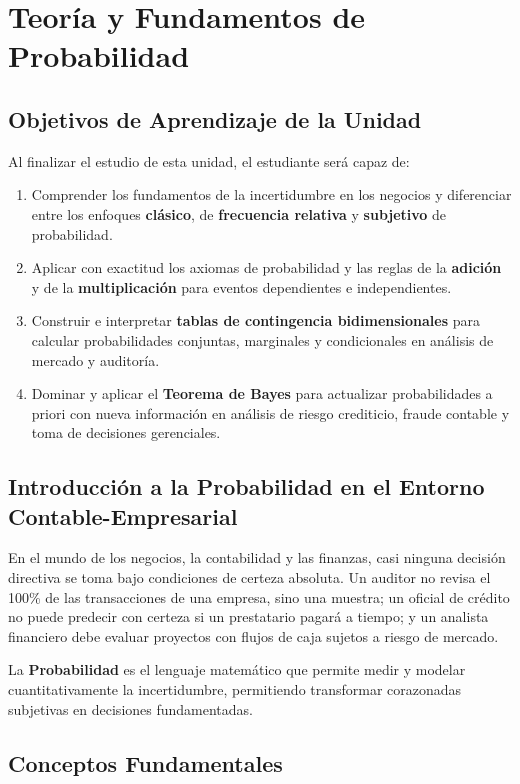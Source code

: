 \chapter{Teoría y Fundamentos de Probabilidad}
\label{cap:probabilidades}

\section*{Objetivos de Aprendizaje de la Unidad}
Al finalizar el estudio de esta unidad, el estudiante será capaz de:
\begin{enumerate}
    \item Comprender los fundamentos de la incertidumbre en los negocios y diferenciar entre los enfoques \textbf{clásico}, de \textbf{frecuencia relativa} y \textbf{subjetivo} de probabilidad.
    \item Aplicar con exactitud los axiomas de probabilidad y las reglas de la \textbf{adición} y de la \textbf{multiplicación} para eventos dependientes e independientes.
    \item Construir e interpretar \textbf{tablas de contingencia bidimensionales} para calcular probabilidades conjuntas, marginales y condicionales en análisis de mercado y auditoría.
    \item Dominar y aplicar el \textbf{Teorema de Bayes} para actualizar probabilidades a priori con nueva información en análisis de riesgo crediticio, fraude contable y toma de decisiones gerenciales.
\end{enumerate}

\section{Introducción a la Probabilidad en el Entorno Contable-Empresarial}
En el mundo de los negocios, la contabilidad y las finanzas, casi ninguna decisión directiva se toma bajo condiciones de certeza absoluta. Un auditor no revisa el 100\% de las transacciones de una empresa, sino una muestra; un oficial de crédito no puede predecir con certeza si un prestatario pagará a tiempo; y un analista financiero debe evaluar proyectos con flujos de caja sujetos a riesgo de mercado.

La \textbf{Probabilidad} es el lenguaje matemático que permite medir y modelar cuantitativamente la incertidumbre, permitiendo transformar corazonadas subjetivas en decisiones fundamentadas.

\section{Conceptos Fundamentales}

